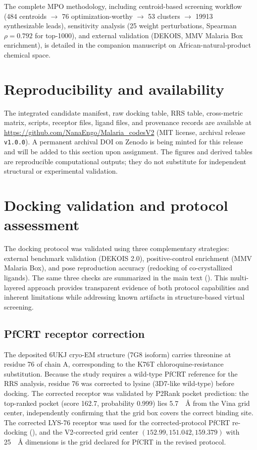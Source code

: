 \documentclass[journal=jcisd8,manuscript=suppinfo]{achemso}
\begin{document}
The complete MPO methodology, including centroid-based screening workflow (\num{484} centroids $\rightarrow$ \num{76} optimization-worthy $\rightarrow$ \num{53} clusters $\rightarrow$ \num{19913} synthesizable leads), sensitivity analysis (\num{25} weight perturbations, Spearman $\rho = \num{0.792}$ for top-1000), and external validation (DEKOIS, MMV Malaria Box enrichment), is detailed in the companion manuscript on African-natural-product chemical space.

\section{Reproducibility and availability}\label{sec:sm_repro}
The integrated candidate manifest, raw docking table, RRS table, cross-metric matrix, scripts, receptor files, ligand files, and provenance records are available at \url{https://github.com/NanaEngo/Malaria_codesV2} (MIT license, archival release \texttt{v1.0.0}). A permanent archival DOI on Zenodo is being minted for this release and will be added to this section upon assignment. The figures and derived tables are reproducible computational outputs; they do not substitute for independent structural or experimental validation.

\section{Docking validation and protocol assessment}\label{sec:sm_validation}
The docking protocol was validated using three complementary strategies: external benchmark validation (DEKOIS 2.0), positive-control enrichment (MMV Malaria Box), and pose reproduction accuracy (redocking of co-crystallized ligands). The same three checks are summarized in the main text (). This multi-layered approach provides transparent evidence of both protocol capabilities and inherent limitations while addressing known artifacts in structure-based virtual screening.

\subsection{PfCRT receptor correction}\label{sec:sm_val_crt}
The deposited 6UKJ cryo-EM structure (7G8 isoform) carries threonine at residue 76 of chain A, corresponding to the K76T chloroquine-resistance substitution. Because the study requires a wild-type PfCRT reference for the RRS analysis, residue 76 was corrected to lysine (3D7-like wild-type) before docking. The corrected receptor was validated by P2Rank pocket prediction: the top-ranked pocket (score 162.7, probability 0.999) lies 5.7~\SI{}{\angstrom} from the Vina grid center, independently confirming that the grid box covers the correct binding site. The corrected LYS-76 receptor was used for the corrected-protocol PfCRT re-docking (), and the V2-corrected grid center $(\num{152.99}, \num{151.042}, \num{159.379})$ with 25~\SI{}{\angstrom} dimensions is the grid declared for PfCRT in the revised protocol.
\end{document}
